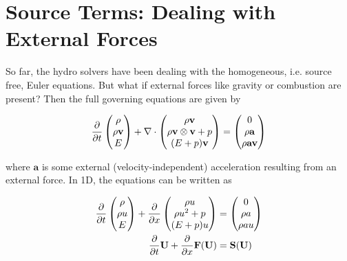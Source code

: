\newpage
\section{Source Terms: Dealing with External Forces}\label{chap:sources}






So far, the hydro solvers have been dealing with the homogeneous, i.e. source free, Euler equations.
But what if external forces like gravity or combustion are present?
Then the full governing equations are given by

\begin{align}
	\frac{\partial}{\partial t}
	\begin{pmatrix}
		\rho \\
		\rho \mathbf{v} \\
		E
	\end{pmatrix}
	+
	\nabla \cdot
	\begin{pmatrix}
		\rho \mathbf{v}\\
		\rho \mathbf{v} \otimes \mathbf{v} + p\\
		(E + p) \mathbf{v}
	\end{pmatrix}
	=
	\begin{pmatrix}
		0\\
		\rho \mathbf{a}\\
		\rho \mathbf{a} \mathbf{v}
	\end{pmatrix}
\end{align}





where $\mathbf{a}$ is some external (velocity-independent) acceleration resulting from an external force.
In 1D, the equations can be written as


\begin{align}
	\deldt
	\begin{pmatrix}
		\rho \\
		\rho u \\
		E
	\end{pmatrix}
	+
	\deldx
	\begin{pmatrix}
		\rho u\\
		\rho u^2 + p\\
		(E + p) u
	\end{pmatrix}
	&=
	\begin{pmatrix}
		0\\
		\rho a\\
		\rho a u
	\end{pmatrix}
	\\
%
	\deldt \U + \deldx \F(\U) &= \mathbf{S}(\U)
\end{align}





